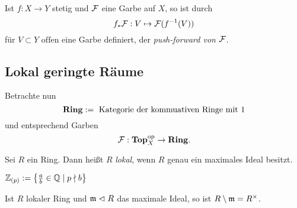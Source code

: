 \begin{definition}
	Ist $f:X \to Y$ stetig und $\mathcal{F}$ eine Garbe auf $X$, so ist durch
	\[ f_\ast \mathcal{F}: V \mapsto \mathcal{F}(f^{-1}(V))\]
	für $V\subset Y \text{ offen}$ eine Garbe definiert, 
	der \emph{push-forward von $\mathcal{F}$}.
\end{definition}



\subsection{Lokal geringte Räume}
Betrachte nun 
\[\mathbf{Ring} := \text{ Kategorie der kommuativen Ringe mit $1$}\]
und entsprechend Garben
\[\mathcal{F}:\mathbf{Top}_X^\mathrm{op} \to \mathbf{Ring}.\]

\begin{definition}
	Sei  $R$ ein Ring. Dann heißt $R$ \emph{lokal}, wenn $R$ genau ein
	maximales Ideal besitzt.
\end{definition}

\begin{beispiel}
	$\mathbb{Z}_{(p)} := \left\{\frac{a}{b} \in \mathbb{Q} \mid p \nmid b\right\}$
\end{beispiel}

\begin{bemerkung}
	Ist $R$ lokaler Ring und $\mathfrak{m} \vartriangleleft R$ das maximale Ideal,
	so ist $R \setminus \mathfrak{m} = R^\times$.
\end{bemerkung}

